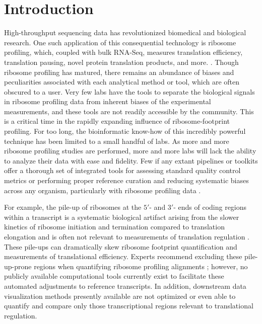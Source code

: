 \documentclass[10pt, oneside]{article}
\begin{document}
\section*{Introduction}
High-throughput sequencing data has revolutionized biomedical and biological research. One such application of this consequential technology is ribosome profiling, which, coupled with bulk RNA-Seq, measures translation efficiency, translation pausing, novel protein translation products, and more. \cite{ingolia_science, riboseq_overview, ingolia_meth}. Though ribosome profiling has matured, there remains an abundance of biases and peculiarities associated with each analytical method or tool, which are often obscured to a user. Very few labs have the tools to separate the biological signals in ribosome profiling data from inherent biases of the experimental measurements, and these tools are not readily accessible by the community. This is a critical time in the rapidly expanding influence of ribosome-footprint profiling. For too long, the bioinformatic know-how of this incredibly powerful technique has been limited to a small handful of labs. As more and more ribosome profiling studies are performed, more and more labs will lack the ability to analyze their data with ease and fidelity. Few if any extant pipelines or toolkits offer a thorough set of integrated tools for assessing standard quality control metrics or performing proper reference curation and reducing systematic biases across any organism, particularly with ribosome profiling data \cite{galaxy, ribogalaxy, nextflow_pipeline, dnanexus_pipeline, riboviz}. \par

For example, the pile-up of ribosomes at the $5'$- and $3'$- ends of coding regions within a transcript is a systematic biological artifact arising from the slower kinetics of ribosome initiation and termination compared to translation elongation and is often not relevant to measurements of translation regulation \cite{gerashchenko_nar, artieri_gr, hussman_plosg}. These pile-ups can dramatically skew ribosome footprint quantification and measurements of translational efficiency. Experts recommend excluding these pile-up-prone regions when quantifying ribosome profiling alignments \cite{ingolia_meth, weinberg_reports}; however, no publicly available computational tools currently exist to facilitate these automated adjustments to reference transcripts. In addition, downstream data visualization methods presently available are not optimized or even able to quantify and compare only those transcriptional regions relevant to translational regulation. \par
\end{document}
